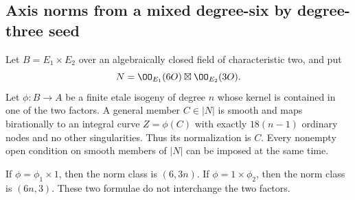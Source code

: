\subsection{Axis norms from a mixed degree-six by degree-three seed}
\label{sec:DE-A3-mixed-axis-norms}

\begin{lemma}
\label{lem:DE-A3-axis-nodal-norm}
Let $B=E_1\times E_2$ over an algebraically closed field of
characteristic two, and put
\[
             N=\OO_{E_1}(6O)\boxtimes\OO_{E_2}(3O).
\]
Let $\phi:B\to A$ be a finite etale isogeny of degree $n$ whose
kernel is contained in one of the two factors.
A general member $C\in|N|$ is smooth and maps birationally to
an integral curve $Z=\phi(C)$ with exactly $18(n-1)$ ordinary
nodes and no other singularities.  Thus its normalization is $C$.
Every nonempty open condition on smooth members of $|N|$ can
be imposed at the same time.

If $\phi=\phi_1\times1$, then the norm class is $(6,3n)$.
If $\phi=1\times\phi_2$, then the norm class is $(6n,3)$.
These two formulae do not interchange the two factors.
\end{lemma}
